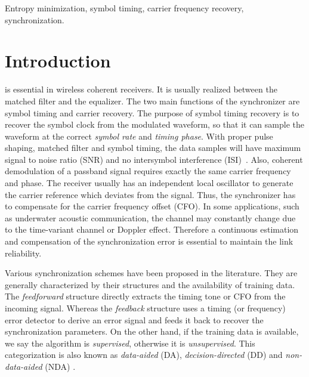 \documentclass[journal,comsoc]{IEEEtran}
\begin{document}
\begin{IEEEkeywords}
Entropy minimization, symbol timing, carrier frequency recovery, synchronization.
\end{IEEEkeywords}

\IEEEpeerreviewmaketitle

\section{Introduction}
\label{sec:intro}
 is essential in wireless coherent receivers.
It is usually realized between the matched filter and the equalizer.
The two main functions of the synchronizer are symbol timing and carrier recovery.
The purpose of symbol timing recovery is to recover the symbol clock from the modulated waveform, so that it can sample the waveform at the correct \textit{symbol rate} and \textit{timing phase}.
With proper pulse shaping, matched filter and symbol timing, the data samples will have maximum signal to noise ratio (SNR) and no intersymbol interference (ISI)~\cite{mengali1997synchronization}.
Also, coherent demodulation of a passband signal requires exactly the same carrier frequency and phase. 
The receiver usually has an independent local oscillator to generate the carrier reference which deviates from the signal.  
Thus, the synchronizer has to compensate for the carrier frequency offset (CFO). 
In some applications, such as underwater acoustic communication, the channel may constantly change due to the time-variant channel or Doppler effect. 
Therefore a continuous estimation and compensation of the synchronization error is essential to maintain the link reliability.

Various synchronization schemes have been proposed in the literature.
They are generally characterized by their structures and the availability of training data.
The \textit{feedforward} structure directly extracts the timing tone or CFO  from the incoming signal.
Whereas the \textit{feedback} structure uses a timing (or frequency) error detector to derive an error signal and feeds it back to recover the synchronization parameters.
On the other hand, if the training data is available, we say the algorithm is \textit{supervised}, otherwise it is \textit{unsupervised}.
This categorization is also known as \textit{data-aided} (DA), \textit{decision-directed} (DD) and \textit{non-data-aided} (NDA) \cite{mengali1997synchronization}.
\end{document}
